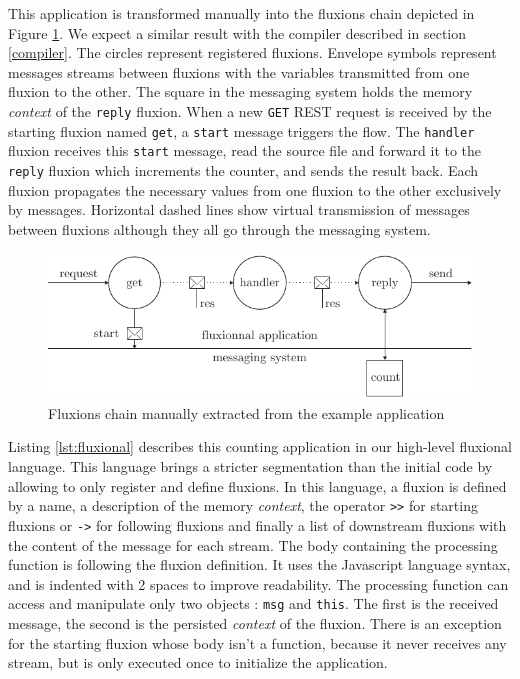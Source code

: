 This application is transformed manually into the fluxions chain depicted in Figure \ref{fig:fluxions}.
We expect a similar result with the compiler described in section \ref{compiler}.
The circles represent registered fluxions.
Envelope symbols represent messages streams between fluxions with the variables transmitted from one fluxion to the other.
The square in the messaging system holds the memory \textit{context} of the \texttt{reply} fluxion.
When a new \texttt{GET} REST request is received by the starting fluxion named \texttt{get}, a \texttt{start} message triggers the flow.
The \texttt{handler} fluxion receives this \texttt{start} message, read the source file and forward it to the \texttt{reply} fluxion which increments the counter, and sends the result back.
Each fluxion propagates the necessary values from one fluxion to the other exclusively by messages.
Horizontal dashed lines show virtual transmission of messages between fluxions although they all go through the messaging system.

\begin{figure}[h!]
  \includegraphics[width=\linewidth]{ressources/flux.pdf}
  \caption{Fluxions chain manually extracted from the example application}
  \label{fig:fluxions}
\end{figure}

Listing \ref{lst:fluxional} describes this counting application in our high-level fluxional language.
This language brings a stricter segmentation than the initial code by allowing to only register and define fluxions.
In this language, a fluxion is defined by a name, a description of the memory \textit{context}, the operator \texttt{>}\texttt{>} for starting fluxions or \texttt{-}\texttt{>} for following fluxions and finally a list of downstream fluxions with the content of the message for each stream.
The body containing the processing function is following the fluxion definition.
It uses the Javascript language syntax, and is indented with 2 spaces to improve readability.
The processing function can access and manipulate only two objects : \texttt{msg} and \texttt{this}.
The first is the received message, the second is the persisted \textit{context} of the fluxion.
There is an exception for the starting fluxion whose body isn't a function, because it never receives any stream, but is only executed once to initialize the application.


